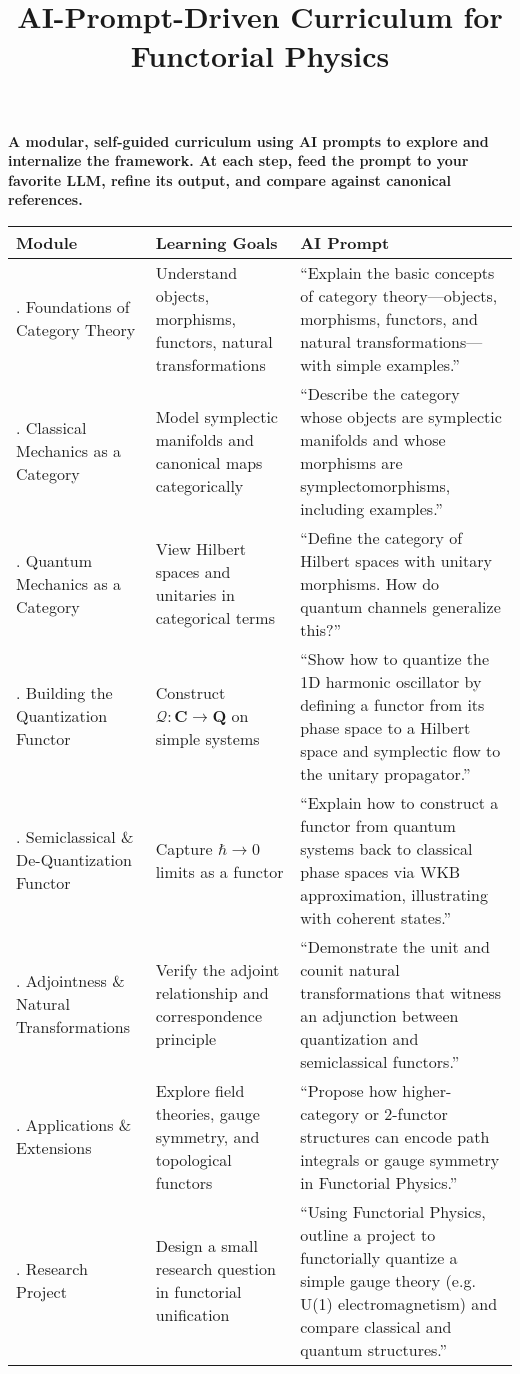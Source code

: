 \documentclass[11pt]{article}
\title{AI-Prompt-Driven Curriculum for Functorial Physics}
\date{}
\begin{document}
\maketitle

\noindent
\textbf{A modular, self-guided curriculum using AI prompts to explore and internalize the framework. At each step, feed the prompt to your favorite LLM, refine its output, and compare against canonical references.}

\vspace{1em}

\renewcommand{\arraystretch}{1.3}
\begin{tabularx}{\textwidth}{>{\raggedright\arraybackslash}p{1.8cm} >{\raggedright\arraybackslash}X >{\raggedright\arraybackslash}X}
\toprule
\textbf{Module} & \textbf{Learning Goals} & \textbf{AI Prompt} \\
\midrule
1. Foundations of Category Theory & Understand objects, morphisms, functors, natural transformations & ``Explain the basic concepts of category theory—objects, morphisms, functors, and natural transformations—with simple examples.'' \\
\midrule
2. Classical Mechanics as a Category & Model symplectic manifolds and canonical maps categorically & ``Describe the category whose objects are symplectic manifolds and whose morphisms are symplectomorphisms, including examples.'' \\
\midrule
3. Quantum Mechanics as a Category & View Hilbert spaces and unitaries in categorical terms & ``Define the category of Hilbert spaces with unitary morphisms. How do quantum channels generalize this?'' \\
\midrule
4. Building the Quantization Functor & Construct $\mathcal{Q} : \mathbf{C} \to \mathbf{Q}$ on simple systems & ``Show how to quantize the 1D harmonic oscillator by defining a functor from its phase space to a Hilbert space and symplectic flow to the unitary propagator.'' \\
\midrule
5. Semiclassical \& De-Quantization Functor & Capture $\hbar \to 0$ limits as a functor & ``Explain how to construct a functor from quantum systems back to classical phase spaces via WKB approximation, illustrating with coherent states.'' \\
\midrule
6. Adjointness \& Natural Transformations & Verify the adjoint relationship and correspondence principle & ``Demonstrate the unit and counit natural transformations that witness an adjunction between quantization and semiclassical functors.'' \\
\midrule
7. Applications \& Extensions & Explore field theories, gauge symmetry, and topological functors & ``Propose how higher-category or 2-functor structures can encode path integrals or gauge symmetry in Functorial Physics.'' \\
\midrule
8. Research Project & Design a small research question in functorial unification & ``Using Functorial Physics, outline a project to functorially quantize a simple gauge theory (e.g. U(1) electromagnetism) and compare classical and quantum structures.'' \\
\bottomrule
\end{tabularx}
\end{document}
